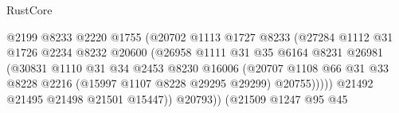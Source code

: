 \begin{lexlean}{RustCore}
\begin{coremodule}
                                            @2199
                                            @8233
                                            @2220
                                            @1755
                                            (@20702
                                              @1113
                                              @1727
                                              @8233
                                              (@27284
                                                @1112
                                                @31
                                                @1726
                                                @2234
                                                @8232
                                                @20600
                                                (@26958
                                                  @1111
                                                  @31
                                                  @35
                                                  @6164
                                                  @8231
                                                  @26981
                                                  (@30831
                                                    @1110
                                                    @31
                                                    @34
                                                    @2453
                                                    @8230
                                                    @16006
                                                    (@20707
                                                      @1108
                                                      @66
                                                      @31
                                                      @33
                                                      @8228
                                                      @2216
                                                      (@15997 @1107 @8228 @29295 @29299)
                                                      @20755)))))
                                            @21492
                                            @21495
                                            @21498
                                            @21501
                                            @15447))
                                        @20793))
                                    (@21509
                                      @1247
                                      @95
                                      @45

\end{coremodule}
\end{lexlean}
